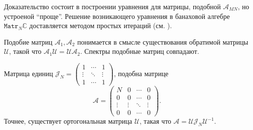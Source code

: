 Доказательство состоит в построении уравнения для матрицы, подобной \( \mathscr{A}_{MN} \),
 но устроеной ``проще''. Решение возникающего уравнения в банаховой алгебре \( \mathtt{Matr}_N\mathbb{C} \)
 доставляется методом простых итераций (см. \cite{baskakov-harmonic}).

Подобие матриц \( \mathcal{A}_1, \mathcal{A}_2 \)
 понимается в смысле существования обратимой матрицы \( \mathcal{U} \),
 такой что \( \mathcal{A}_1 \mathcal{U} = \mathcal{U} \mathcal{A}_2 \).
Спектры подобные матриц совпадают.

\begin{lem}
    Матрица единиц 
    \( \mathcal{J}_N =
    \begin{pmatrix}
        1 & \cdots & 1 \\
        \vdots & \ddots & \vdots \\ 
    1 & \cdots & 1 \end{pmatrix} \),
    подобна матрице
    \[
        \mathcal{A} = \begin{pmatrix}
            N & 0 & \cdots & 0 \\
            0 & 0 & \cdots & 0 \\
            \vdots & \vdots & \ddots & \vdots \\
            0 & 0 & \cdots & 0 \end{pmatrix}. \]
    Точнее, существует ортогональная матрица \( \mathcal{U} \),
    такая что
    \( \mathcal{A} = \mathcal{U}\mathcal{J}_N \mathcal{U}^{-1} \).
\end{lem}
